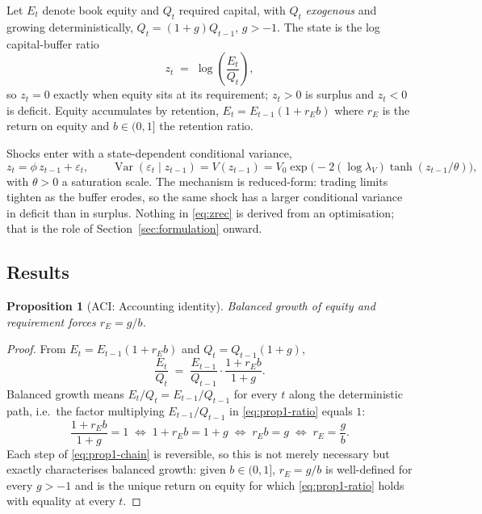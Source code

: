 \documentclass[11pt]{article}
\newtheorem{proposition}{Proposition}
\theoremstyle{remark}
\newcommand{\Var}{\operatorname{Var}}
\begin{document}
Let $E_t$ denote book equity and $Q_t$ required capital, with $Q_t$
\emph{exogenous} and growing deterministically,
$Q_t = (1+g)Q_{t-1}$, $g > -1$. The state is the log capital-buffer ratio
\begin{equation}
z_t \;=\; \log\!\left(\frac{E_t}{Q_t}\right),
\label{eq:z}
\end{equation}
so $z_t = 0$ exactly when equity sits at its requirement; $z_t > 0$ is
surplus and $z_t < 0$ is deficit. Equity accumulates by retention,
$E_t = E_{t-1}(1 + r_E b)$ where $r_E$ is the return on equity and
$b \in (0,1]$ the retention ratio.

Shocks enter with a state-dependent conditional variance,
\begin{equation}
z_t = \phi\, z_{t-1} + \varepsilon_t, \qquad
\Var(\varepsilon_t \mid z_{t-1}) = V(z_{t-1})
= V_0 \exp\!\big(-2(\log\lambda_V) \tanh(z_{t-1}/\theta)\big),
\label{eq:zrec}
\end{equation}
with $\theta>0$ a saturation scale. The mechanism is reduced-form: trading
limits tighten as the buffer erodes, so the same shock has a larger
conditional variance in deficit than in surplus. Nothing in
\eqref{eq:zrec} is derived from an optimisation; that is the role of
Section~\ref{sec:formulation} onward.

\subsection{Results}

\begin{proposition}[ACI: Accounting identity]
\label{prop:identity}
Balanced growth of equity and requirement forces $r_E = g/b$.
\end{proposition}

\begin{proof}
From $E_t = E_{t-1}(1+r_E b)$ and $Q_t = Q_{t-1}(1+g)$,
\begin{equation}
\frac{E_t}{Q_t} \;=\; \frac{E_{t-1}}{Q_{t-1}} \cdot \frac{1+r_E b}{1+g}.
\label{eq:prop1-ratio}
\end{equation}
Balanced growth means $E_t/Q_t = E_{t-1}/Q_{t-1}$ for every $t$ along the
deterministic path, i.e.\ the factor multiplying $E_{t-1}/Q_{t-1}$ in
\eqref{eq:prop1-ratio} equals $1$:
\begin{equation}
\frac{1+r_E b}{1+g} = 1
\;\Longleftrightarrow\;
1+r_E b = 1+g
\;\Longleftrightarrow\;
r_E b = g
\;\Longleftrightarrow\;
r_E = \frac{g}{b}.
\label{eq:prop1-chain}
\end{equation}
Each step of \eqref{eq:prop1-chain} is reversible, so this is not merely
necessary but exactly characterises balanced growth: given $b\in(0,1]$,
$r_E=g/b$ is well-defined for every $g>-1$ and is the unique return on
equity for which \eqref{eq:prop1-ratio} holds with equality at every $t$.
\end{proof}
\end{document}
